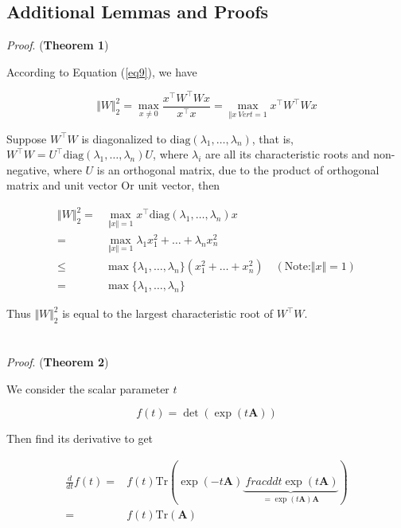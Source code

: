 \documentclass[final]{cvpr}
\begin{document}
\clearpage
\begin {appendix}
\section{Additional Lemmas and Proofs}
\label{app1}
\noindent\emph{Proof}. (\textbf{Theorem 1})

According to Equation (\ref{eq9}), we have

\begin{equation}
\Vert W\Vert_2^2 = \max_{x\neq 0}\frac{x^{\top}W^{\top} Wx}{x^{\top} x} = \max_{\Vert x\ Vert=1}x^{\top}W^{\top} Wx
\end{equation}

Suppose $W^{\top} W$ is diagonalized to $\text{diag}(\lambda_1,\dots,\lambda_n)$, that is, $W^{\top} W=U^{\top}\text {diag}(\lambda_1,\dots,\lambda_n)U$, where $\lambda_i$ are all its characteristic roots and non-negative, where $U$ is an orthogonal matrix, due to the product of orthogonal matrix and unit vector Or unit vector, then

\begin{equation}
\begin{aligned}\Vert W\Vert_2^2 =& \max_{\Vert x\Vert=1}x^{\top}\text{diag}(\lambda_1,\dots,\lambda_n) x \\
=& \max_{\Vert x\Vert=1} \lambda_1 x_1^2 + \dots + \lambda_n x_n^2\\
\leq & \max\{\lambda_1,\dots,\lambda_n\} (x_1^2 + \dots + x_n^2)\quad(\text{Note:}\Vert x\Vert=1)\\
=&\max\{\lambda_1,\dots,\lambda_n\}\end{aligned}
\end{equation}

Thus $\Vert W\Vert_2^2$ is equal to the largest characteristic root of $W^{\top} W$.
\\
\\
\\
\noindent\emph{Proof}. (\textbf{Theorem 2})

We consider the scalar parameter $t$

\begin{equation}f(t)=\det(\exp(t\boldsymbol{A}))\end{equation}

Then find its derivative to get

\begin{equation}\begin{aligned}\frac{d}{dt}f(t)=&f(t)\text{Tr}\left(\exp(-t\boldsymbol{A})\underbrace{\ frac{d}{dt}\exp(t\boldsymbol{A})}_{=\exp(t\boldsymbol{A})\boldsymbol{A}}\right)\\
=&f(t)\text{Tr}(\boldsymbol{A})\end{aligned}\end{equation}


\end{appendix}
\end{document}
